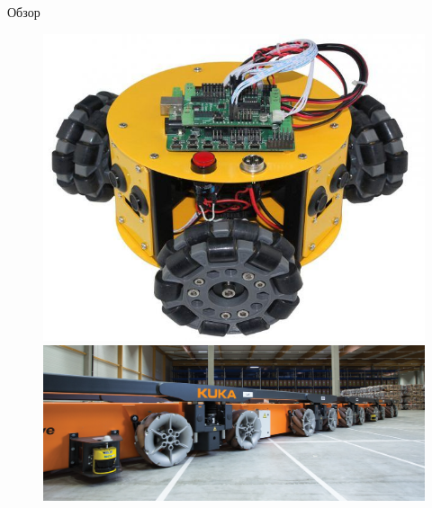 \begin{myposter}{
    Обзор
}
{\begin{figure}[H]
            \endminipage
        \end{figure}
        \vspace{-10pt}
        \begin{figure}[H]
            \centering
                \centering
                \includegraphics[width=\linewidth]{content/pic/photo/vehicle_three_two_row.jpg}
            \endminipage
                \centering
                \includegraphics[width=\linewidth]{content/pic/photo/vehicle_kuka.png}
            \endminipage
        \end{figure}
    }
    
\end{myposter}
